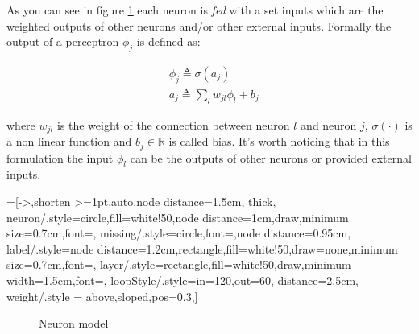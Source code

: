 As you can see in figure \ref{neuron_model} each neuron is \textit{fed} with a set inputs which are the weighted outputs of other neurons and/or other external inputs.
Formally the output of a perceptron $\phi_j$
is defined as:
 
\begin{align}
&\phi_j \triangleq \sigma(a_j)\\
&a_j \triangleq \sum_l w_{jl}\phi_l +b_j
\end{align}

where $w_{jl}$ is the weight of the connection between neuron $l$ and neuron $j$, $\sigma(\cdot)$ is a non linear function and $b_j \in \mathbb{R}$ is called bias.
It's worth noticing that in this formulation the input $\phi_l$ can be the outputs of other neurons or provided external inputs.


=[->,shorten >=1pt,auto,node distance=1.5cm,
  thick,
  neuron/.style={circle,fill=white!50,node distance=1cm,draw,minimum size=0.7cm,font=\sffamily\normalsize},
  missing/.style={circle,font=\sffamily\Large,node distance=0.95cm},
  label/.style={node distance=1.2cm,rectangle,fill=white!50,draw=none,minimum size=0.7cm,font=\sffamily\normalsize},
  layer/.style={rectangle,fill=white!50,draw,minimum width=1.5cm,font=\sffamily\Large},
  loopStyle/.style={in=120,out=60, distance=2.5cm},
  weight/.style = {above,sloped,pos=0.3},]
\begin{figure}
 \centering
{}
\caption{Neuron model}
\label{neuron_model}
\end{figure}

